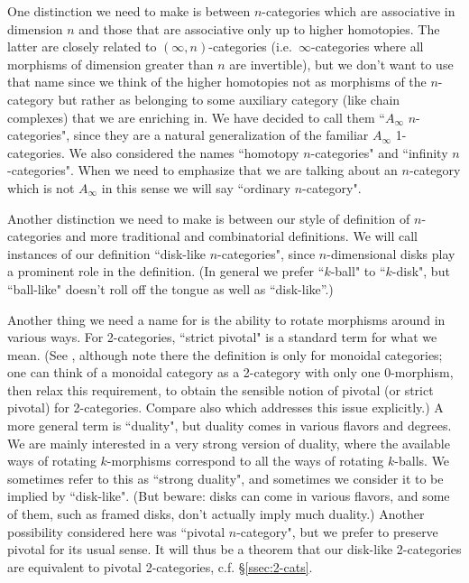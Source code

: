 One distinction we need to make is between $n$-categories which are associative in dimension $n$ and those
that are associative only up to higher homotopies.
The latter are closely related to $(\infty, n)$-categories (i.e.\ $\infty$-categories where all morphisms
of dimension greater than $n$ are invertible), but we don't want to use that name
since we think of the higher homotopies not as morphisms of the $n$-category but
rather as belonging to some auxiliary category (like chain complexes)
that we are enriching in.
We have decided to call them ``$A_\infty$ $n$-categories", since they are a natural generalization 
of the familiar $A_\infty$ 1-categories.
We also considered the names ``homotopy $n$-categories" and ``infinity $n$-categories".
When we need to emphasize that we are talking about an $n$-category which is not $A_\infty$ in this sense
we will say ``ordinary $n$-category".

Another distinction we need to make is between our style of definition of $n$-categories and
more traditional and combinatorial definitions.
We will call instances of our definition ``disk-like $n$-categories", since $n$-dimensional disks
play a prominent role in the definition.
(In general we prefer ``$k$-ball" to ``$k$-disk", but ``ball-like" doesn't roll off 
the tongue as well as ``disk-like''.)

Another thing we need a name for is the ability to rotate morphisms around in various ways.
For 2-categories, ``strict pivotal" is a standard term for what we mean. (See \cite{MR1686423, 0908.3347}, although note there the definition is only for monoidal categories; one can think of a monoidal category as a 2-category with only one $0$-morphism, then relax this requirement, to obtain the sensible notion of pivotal (or strict pivotal) for 2-categories. Compare also \cite{1009.0186} which addresses this issue explicitly.)
A more general term is ``duality", but duality comes in various flavors and degrees.
We are mainly interested in a very strong version of duality, where the available ways of
rotating $k$-morphisms correspond to all the ways of rotating $k$-balls.
We sometimes refer to this as ``strong duality", and sometimes we consider it to be implied
by ``disk-like".
(But beware: disks can come in various flavors, and some of them, such as framed disks,
don't actually imply much duality.)
Another possibility considered here was ``pivotal $n$-category", but we prefer to preserve pivotal for its usual sense. 
It will thus be a theorem that our disk-like 2-categories 
are equivalent to pivotal 2-categories, c.f. \S \ref{ssec:2-cats}.

